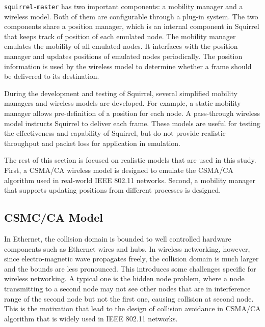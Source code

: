 \documentclass[12pt]{report}
\begin{document}
\texttt{squirrel-master} has two important components: a mobility manager and a wireless model. Both of them are configurable through a plug-in system. The two components share a position manager, which is an internal component in Squirrel that keeps track of position of each emulated node. The mobility manager emulates the mobility of all emulated nodes. It interfaces with the position manager and updates positions of emulated nodes periodically. The position information is used by the wireless model to determine whether a frame should be delivered to its destination.

During the development and testing of Squirrel, several simplified mobility managers and wireless models are developed. For example, a static mobility manager allows pre-definition of a position for each node. A pass-through wireless model instructs Squirrel to deliver each frame. These models are useful for testing the effectiveness and capability of Squirrel, but do not provide realistic throughput and packet loss for application in emulation.

The rest of this section is focused on realistic models that are used in this study. First, a CSMA/CA wireless model is designed to emulate the CSMA/CA algorithm used in real-world IEEE 802.11 networks. Second, a mobility manager that supports updating positions from different processes is designed.

\subsection{CSMC/CA Model}
\label{sec:squirrel_csmaca}

In Ethernet, the collision domain is bounded to well controlled hardware components such as Ethernet wires and hubs. In wireless networking, however, since electro-magnetic wave propagates freely, the collision domain is much larger and the bounds are less pronounced. This introduces some challenges specific for wireless networking. A typical one is the hidden node problem, where a node transmitting to a second node may not see other nodes that are in interference range of the second node but not the first one, causing collision at second node. This is the motivation that lead to the design of collision avoidance in CSMA/CA algorithm that is widely used in IEEE 802.11 networks.
\end{document}
